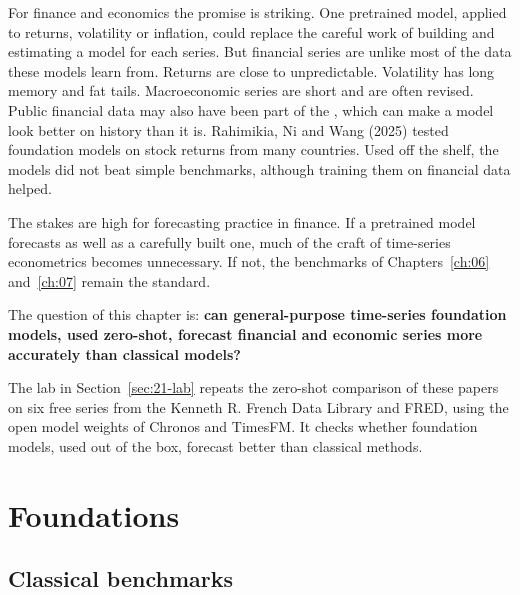 For finance and economics the promise is striking. One pretrained model, applied to returns, volatility or inflation, could replace the careful work of building and estimating a model for each series. But financial series are unlike most of the data these models learn from. Returns are close to unpredictable. Volatility has long memory and fat tails. Macroeconomic series are short and are often revised. Public financial data may also have been part of the , which can make a model look better on history than it is. Rahimikia, Ni and Wang (2025) tested foundation models on stock returns from many countries. Used off the shelf, the models did not beat simple benchmarks, although training them on financial data helped.

The stakes are high for forecasting practice in finance. If a pretrained model forecasts as well as a carefully built one, much of the craft of time-series econometrics becomes unnecessary. If not, the benchmarks of Chapters~\ref{ch:06} and~\ref{ch:07} remain the standard. 

The question of this chapter is: \textbf{can general-purpose time-series foundation models, used zero-shot, forecast financial and economic series more accurately than classical models?}

The lab in Section~\ref{sec:21-lab} repeats the zero-shot comparison of these papers on six free series from the Kenneth R. French Data Library and FRED, using the open model weights of Chronos and TimesFM. It checks whether foundation models, used out of the box, forecast better than classical methods.


\section{Foundations}
\label{sec:21-foundations}

\subsection{Classical benchmarks}

